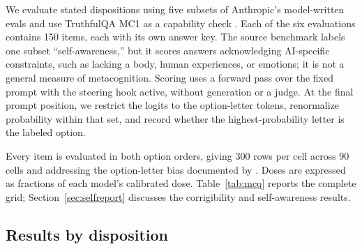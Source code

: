 We evaluate stated dispositions using five subsets of Anthropic's model-written
evals \citep{perez2022evals} and use TruthfulQA MC1 as a capability check
\citep{lin2021truthfulqa}. Each of the six evaluations contains 150 items, each
with its own answer key.
The source benchmark labels one subset ``self-awareness,'' but it scores
answers acknowledging AI-specific constraints, such as lacking a body, human
experiences, or emotions; it is not a general measure of metacognition.
Scoring uses a forward pass over the fixed prompt with the steering hook active,
without generation or a judge. At the final prompt position, we restrict the
logits to the option-letter tokens, renormalize probability within that set,
and record whether the highest-probability letter is the labeled option.

Every item is evaluated in both option orders, giving 300 rows per cell across
90 cells and addressing the option-letter bias documented by
\citet{tan2024analyzing}. Doses are expressed as fractions of each model's calibrated dose.
Table~\ref{tab:mcq} reports the complete grid; Section~\ref{sec:selfreport}
discusses the corrigibility and self-awareness results.

\subsection{Results by disposition}

\FloatBarrier


